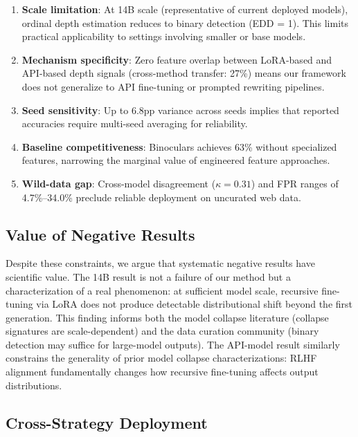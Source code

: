 \documentclass[11pt,a4paper]{article}
\begin{document}
\begin{enumerate}[nosep]
    \item \textbf{Scale limitation}: At 14B scale (representative of current deployed models), ordinal depth estimation reduces to binary detection (EDD = 1). This limits practical applicability to settings involving smaller or base models.
    \item \textbf{Mechanism specificity}: Zero feature overlap between LoRA-based and API-based depth signals (cross-method transfer: 27\%) means our framework does not generalize to API fine-tuning or prompted rewriting pipelines.
    \item \textbf{Seed sensitivity}: Up to 6.8pp variance across seeds implies that reported accuracies require multi-seed averaging for reliability.
    \item \textbf{Baseline competitiveness}: Binoculars achieves 63\% without specialized features, narrowing the marginal value of engineered feature approaches.
    \item \textbf{Wild-data gap}: Cross-model disagreement ($\kappa = 0.31$) and FPR ranges of 4.7\%--34.0\% preclude reliable deployment on uncurated web data.
\end{enumerate}

\subsection{Value of Negative Results}

Despite these constraints, we argue that systematic negative results have scientific value. The 14B result is not a failure of our method but a characterization of a real phenomenon: at sufficient model scale, recursive fine-tuning via LoRA does not produce detectable distributional shift beyond the first generation. This finding informs both the model collapse literature (collapse signatures are scale-dependent) and the data curation community (binary detection may suffice for large-model outputs). The API-model result similarly constrains the generality of prior model collapse characterizations: RLHF alignment fundamentally changes how recursive fine-tuning affects output distributions.

\subsection{Cross-Strategy Deployment}
\end{document}
